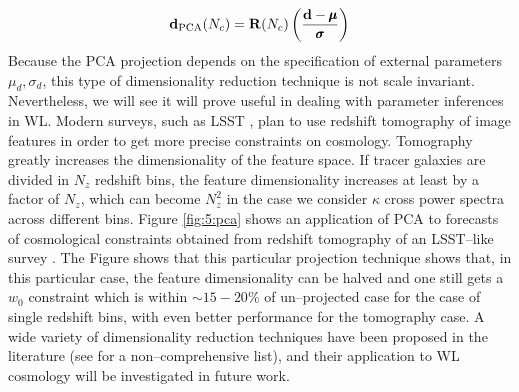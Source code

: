 \begin{equation}
\label{eq:5:pca-projection}
\mathbf{d}_{\rm PCA}(N_c) = \mathbf{R}(N_c)\left(\frac{\mathbf{d}-\pmb{\mu}}{\pmb{\sigma}}\right)
\end{equation}
%
Because the PCA projection depends on the specification of external parameters $\mu_d,\sigma_d$, this type of dimensionality reduction technique is not scale invariant. Nevertheless, we will see it will prove useful in dealing with parameter inferences in WL. Modern surveys, such as LSST \citep{LSST}, plan to use redshift tomography of image features in order to get more precise constraints on cosmology. Tomography greatly increases the dimensionality of the feature space. If tracer galaxies are divided in $N_z$ redshift bins, the feature dimensionality increases at least by a factor of $N_z$, which can become $N_z^2$ in the case we consider $\kappa$ cross power spectra across different bins. Figure \ref{fig:5:pca} shows an application of PCA to forecasts of cosmological constraints obtained from redshift tomography of an LSST--like survey \citep{PetriPhotoZ}. The Figure shows that this particular projection technique shows that, in this particular case, the feature dimensionality can be halved and one still gets a $w_0$ constraint which is within $\sim 15-20\%$ of un--projected case for the case of single redshift bins, with even better performance for the tomography case. A wide variety of dimensionality reduction techniques have been proposed in the literature (see \citep{astroMLText} for a non--comprehensive list), and their application to WL cosmology will be investigated in future work.  

